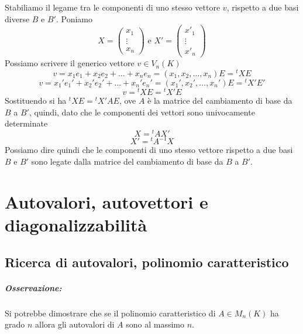 \documentclass[twoside]{report}
\begin{document}
Stabiliamo il legame tra le componenti di uno stesso vettore \(v\), rispetto a due basi diverse \(B\) e \(B'\). Poniamo \[
X = \begin{pmatrix} x_1\\ \vdots\\ x_n \end{pmatrix} \text{ e } X'=\begin{pmatrix} x'_1\\ \vdots\\ x'_n \end{pmatrix}
\] Possiamo scrivere il generico vettore \(v \in V_n(K)\) \[
v = x_1e_1+x_2e_2 + \ldots + x_n e_n = (x_1,x_2, \ldots , x_n)E= {^{t}X}E \] \[
v = x_1'e_1'+x_2'e_2' + \ldots + x_n' e_n' = (x_1',x_2', \ldots , x_n')E= {^{t}X'}E'
\] \[
v = {^{t}X}E = {^{t}X'}E
\] Sostituendo si ha \({^{t}X}E = {^tX'}AE\), ove \(A\) è la matrice del cambiamento di base da \(B\) a \(B'\), quindi, dato che le componenti dei vettori sono univocamente determinate \[
X = {^tA}X'
\] \[
X' = {^tA^{-1}}X
\] Possiamo dire quindi che le componenti di uno stesso vettore rispetto a due basi \(B\) e \(B'\) sono legate dalla matrice del cambiamento di base da \(B\) a \(B'\).

\chapter{Autovalori, autovettori e diagonalizzabilità}
\section{Ricerca di autovalori, polinomio caratteristico}

\paragraph{Osservazione:} Si potrebbe dimostrare che se il polinomio caratteristico di \(A \in M_n(K)\) ha grado \(n\) allora gli autovalori di \(A\) sono al massimo \(n\).
\end{document}
